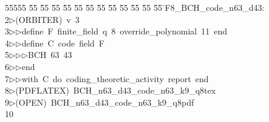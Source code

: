 %
%
\begin{tabbing}
55555 \= 55 \= 55 \= 55 \= 55 \= 55 \= 55 \= 55 \= 55 \= 55 \= 55 \= 55 \= 55 \= \>F8\_BCH\_code\_n63\_d43:\\[0pt]
2\>$\triangleright$\>(ORBITER)\ v\ 3\ \\[0pt]
3\>$\triangleright$\>$\triangleright$\>define\ F\ finite\_field\ q\ 8\ override\_polynomial\ 11\ end\ \\[0pt]
4\>$\triangleright$\>$\triangleright$\>define\ C\ code\ field\ F\ \\[0pt]
5\>$\triangleright$\>$\triangleright$\>$\triangleright$\>BCH\ 63\ 43\ \\[0pt]
6\>$\triangleright$\>$\triangleright$\>end\ \\[0pt]
7\>$\triangleright$\>$\triangleright$\>with\ C\ do\ coding\_theoretic\_activity\ report\ end\\[0pt]
8\>$\triangleright$\>(PDFLATEX)\ BCH\_n63\_d43\_code\_n63\_k9\_q8tex\\[0pt]
9\>$\triangleright$\>(OPEN)\ BCH\_n63\_d43\_code\_n63\_k9\_q8pdf\\[0pt]
10\>\end{tabbing}
